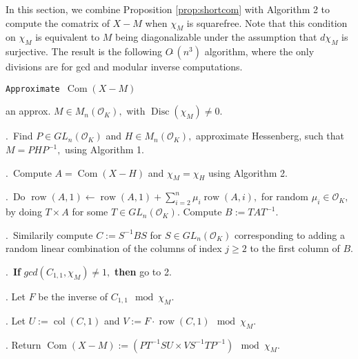 \documentclass{sig-alternate-05-2015}
\DeclareMathOperator{\com}{Com}
\DeclareMathOperator{\disc}{Disc}
\DeclareMathOperator{\row}{row}
\DeclareMathOperator{\col}{col}
\newcommand{\OK}{\mathcal{O}_K}
\newcommand{\softO}{O\tilde{~}}
\begin{document}
In this section, we combine Proposition \ref{prop:shortcom}
with Algorithm 2 to compute the comatrix of $X-M$
when $\chi_M$ is squarefree.   Note that this condition on
$\chi_M$ is equivalent to $M$ being diagonalizable under
the assumption that $d\chi_M$ is surjective.  The result is
the following $\softO(n^3)$ algorithm, where the only
divisions are for gcd and modular inverse computations.

\noindent\hrulefill

 {\tt Approximate $\com (X{-}M)$ }

 an approx. $M \in M_n(\OK),$ with $\disc(\chi_M) \neq 0.$ 

\smallskip

.\ Find $P \in GL_n(\OK)$ and $H \in M_n(\OK),$ approximate Hessenberg,
such that $M=PHP^{-1},$ using Algorithm 1. 

.\ Compute $A=\com (X-H)$ and $\chi_M = \chi_H$ using Algorithm 2.


.\ Do $\row(A,1) \leftarrow \row(A,1)+\sum_{i=2}^n \mu_i \row(A,i),$ for
random $\mu_i \in \OK,$ by doing $T \times A$ for some $T \in GL_n(\OK).$
Compute $B:=TAT^{-1}.$

.\ Similarily compute $C:=S^{-1}BS$ for $S \in GL_n(\OK)$ corresponding to
adding a random linear combination of the columns of index $j \ge 2$
to the first column of $B.$ 

.\  \textbf{If} $gcd(C_{1,1}, \chi_M) \neq 1,$ \textbf{then} go to 2.

. Let $F$ be the inverse of $C_{1,1} \mod \chi_M$.

. Let $U := \col(C,1)$ and $V := F \cdot \row(C,1) \mod \chi_M$.

. Return $\com(X-M):=(PT^{-1}S U \times V S^{-1} T P^{-1}) \mod \chi_M.$

\vspace{-1ex}\noindent\hrulefill

\medskip
\end{document}
